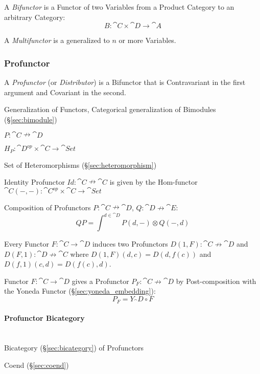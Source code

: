A \emph{Bifunctor} is a Functor of two Variables from a Product
Category to an arbitrary Category:
\[
  B : \cat{C} \times \cat{D} \rightarrow \cat{A}
\]

A \emph{Multifunctor} is a generalized to $n$ or more Variables.



\subsubsection{Profunctor}\label{sec:profunctor}

A \emph{Profunctor} (or \emph{Distributor}) is a Bifunctor that is
Contravariant in the first argument and Covariant in the second.

Generalization of Functors, Categorical generalization of Bimodules
(\S\ref{sec:bimodule})

$P : \cat{C} \nrightarrow \cat{D}$

$H_P : \cat{D}^{op} \times \cat{C} \rightarrow \cat{Set}$

Set of Heteromorphisms (\S\ref{sec:heteromorphism})

Identity Profunctor $Id : \cat{C} \nrightarrow \cat{C}$ is given by
the Hom-functor $\cat{C}(-,-) : \cat{C}^{op} \times \cat{C}
\rightarrow \cat{Set}$

Composition of Profunctors $P : \cat{C} \nrightarrow \cat{D}$, $Q :
\cat{D} \nrightarrow \cat{E}$:
\[
  Q P = \int^{d \in \cat{D}} P(d,-) \otimes Q(-,d)
\]

Every Functor $F : \cat{C} \rightarrow \cat{D}$ induces two
Profunctors $D(1,F) : \cat{C} \nrightarrow \cat{D}$ and $D(F,1)
: \cat{D} \nrightarrow \cat{C}$ where $D(1,F)(d,c) = D(d,f(c))$
and $D(f,1)(c,d) = D(f(c),d)$.

Functor $F : \cat{C} \rightarrow \cat{D}$ gives a Profunctor $P_F :
\cat{C} \nrightarrow \cat{D}$ by Post-composition with the Yoneda
Functor (\S\ref{sec:yoneda_embedding}):
\[
  P_F = Y_\cat{D} \circ F
\]



\paragraph{Profunctor Bicategory}\label{sec:profunctor_bicategory}
\hfill \\

Bicategory (\S\ref{sec:bicategory}) of Profunctors

Coend (\S\ref{sec:coend})



